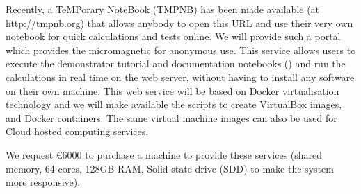 \begin{workpackage}
\begin{tasklist}
\begin{task}[lead=USO,id=oommf-nb-ve,title=Online portal for
  micromagnetic VRE demonstrator,PM=3,partners={SR,FAU},wphases=25-28,issue=82]
  Recently, a TeMPorary \Jupyter NoteBook (TMPNB) has been made
  available (at \href{http://tmpnb.org}{http://tmpnb.org}) that allows
  anybody to open this URL and use their very own \Jupyter notebook
  for quick calculations and tests online. We will provide such a
  portal which provides the
  micromagnetic \VRE for anonymous use. This service allows users to
  execute the demonstrator tutorial and documentation notebooks
  () and run the
  calculations in real time on the web server, without having to
  install any software on their own machine.  This web service will be
  based on Docker \cite{Docker} virtualisation technology and we will
  make available the scripts to create VirtualBox \cite{Virtualbox}
  images, and Docker containers. The same virtual machine images can
  also be used for Cloud hosted computing services.


  We request \euro{6000} to purchase a machine to provide these
  services (shared memory, 64 cores, 128GB RAM, Solid-state drive (SDD)
  to make the system more responsive).
\end{task}

\end{tasklist}


\end{workpackage}
